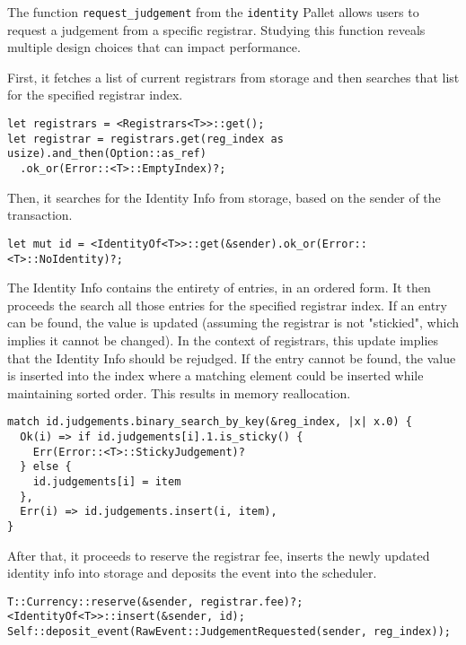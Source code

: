 \documentclass[11pt,a4paper]{article}
\begin{document}
The function \verb|request_judgement| from the \verb|identity| Pallet allows users to request a judgement
from a specific registrar. Studying this function reveals multiple design choices that can impact performance.
\newline

First, it fetches a list of current registrars from storage and then searches that list for the specified
registrar index.

\begin{verbatim}
let registrars = <Registrars<T>>::get();
let registrar = registrars.get(reg_index as usize).and_then(Option::as_ref)
  .ok_or(Error::<T>::EmptyIndex)?;
\end{verbatim}

Then, it searches for the Identity Info from storage, based on the sender of the transaction.

\begin{verbatim}
let mut id = <IdentityOf<T>>::get(&sender).ok_or(Error::<T>::NoIdentity)?;
\end{verbatim}

The Identity Info contains the entirety of entries, in an ordered form. It then proceeds the search all
those entries for the specified registrar index. If an entry can be found, the value is updated
(assuming the registrar is not "stickied", which implies it cannot be changed). In the context of registrars,
this update implies that the Identity Info should be rejudged. If the entry cannot 
be found, the value is inserted into the index where a matching element could be inserted while maintaining
sorted order. This results in memory reallocation.

\begin{verbatim}
match id.judgements.binary_search_by_key(&reg_index, |x| x.0) {
  Ok(i) => if id.judgements[i].1.is_sticky() {
    Err(Error::<T>::StickyJudgement)?
  } else {
    id.judgements[i] = item
  },
  Err(i) => id.judgements.insert(i, item),
}
\end{verbatim}

After that, it proceeds to reserve the registrar fee, inserts the newly updated identity info into storage
and deposits the event into the scheduler.

\begin{verbatim}
T::Currency::reserve(&sender, registrar.fee)?;
<IdentityOf<T>>::insert(&sender, id);
Self::deposit_event(RawEvent::JudgementRequested(sender, reg_index));
\end{verbatim}
\end{document}
